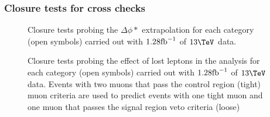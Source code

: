 \subsubsection{Closure tests for cross checks}

\begin{figure}[h!]
  \begin{center}
    \caption{Closure tests probing the $\Delta\phi *$ extrapolation for each
    \njet category (open symbols) carried out with $1.28\text{fb}^{-1}$ of
      $13\tev$ data. }
    \label{fig:closureAlphaT}
  \end{center} 
\end{figure}

\begin{figure}[h!]
  \begin{center}
    \caption{Closure tests probing the effect of lost leptons in the
    analysis for each
    \njet category (open symbols) carried out with $1.28\text{fb}^{-1}$ of
      $13\tev$ data. Events with two muons that pass the control
      region (tight) muon criteria are used to predict events with one
      tight muon and one muon that passes the signal region veto
      criteria (loose)}
    \label{fig:closureAlphaT}
  \end{center} 
\end{figure}



